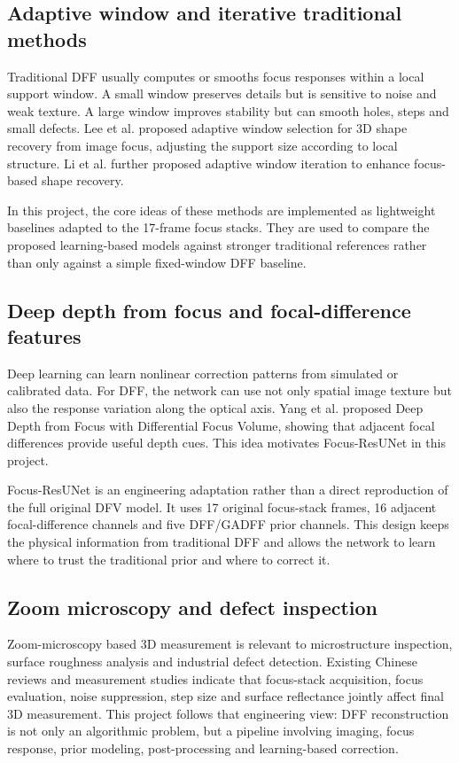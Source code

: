 \documentclass[11pt,a4paper]{article}
\begin{document}
\subsection{Adaptive window and iterative traditional methods}

Traditional DFF usually computes or smooths focus responses within a local support window. A small window preserves details but is sensitive to noise and weak texture. A large window improves stability but can smooth holes, steps and small defects. Lee et al. proposed adaptive window selection for 3D shape recovery from image focus, adjusting the support size according to local structure. Li et al. further proposed adaptive window iteration to enhance focus-based shape recovery.

In this project, the core ideas of these methods are implemented as lightweight baselines adapted to the 17-frame focus stacks. They are used to compare the proposed learning-based models against stronger traditional references rather than only against a simple fixed-window DFF baseline.

\subsection{Deep depth from focus and focal-difference features}

Deep learning can learn nonlinear correction patterns from simulated or calibrated data. For DFF, the network can use not only spatial image texture but also the response variation along the optical axis. Yang et al. proposed Deep Depth from Focus with Differential Focus Volume, showing that adjacent focal differences provide useful depth cues. This idea motivates Focus-ResUNet in this project.

Focus-ResUNet is an engineering adaptation rather than a direct reproduction of the full original DFV model. It uses 17 original focus-stack frames, 16 adjacent focal-difference channels and five DFF/GADFF prior channels. This design keeps the physical information from traditional DFF and allows the network to learn where to trust the traditional prior and where to correct it.

\subsection{Zoom microscopy and defect inspection}

Zoom-microscopy based 3D measurement is relevant to microstructure inspection, surface roughness analysis and industrial defect detection. Existing Chinese reviews and measurement studies indicate that focus-stack acquisition, focus evaluation, noise suppression, step size and surface reflectance jointly affect final 3D measurement. This project follows that engineering view: DFF reconstruction is not only an algorithmic problem, but a pipeline involving imaging, focus response, prior modeling, post-processing and learning-based correction.
\end{document}
